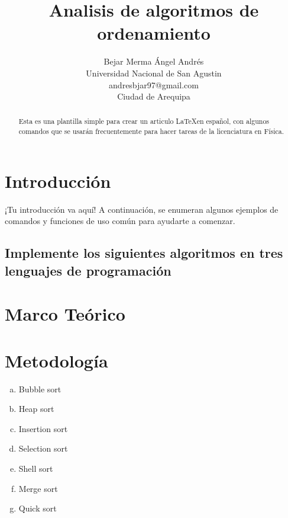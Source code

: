 \documentclass[a4paper]{article}
\title{Analisis de algoritmos de ordenamiento }
\author{Bejar Merma Ángel Andrés\\
  \small Universidad Nacional de San Agustin\\
  \small andresbjar97@gmail.com\\
  \small Ciudad de Arequipa
  \date{}
}
\begin{document}
\maketitle

\begin{abstract}
Esta es una plantilla simple para crear un articulo \LaTeX en español, con algunos comandos que se usarán frecuentemente para hacer tareas de la licenciatura en Física.
\end{abstract}

\section{Introducci\'on}

¡Tu introducción va aquí! A continuación, se enumeran algunos ejemplos de comandos y funciones de uso común para ayudarte a comenzar.








\subsection{Implemente los siguientes algoritmos en tres lenguajes de programación}





\section{Marco Teórico}

\section{Metodología}

\begin{enumerate}[a)]

\item Bubble sort

\item Heap sort

\item Insertion sort

\item Selection sort

\item Shell sort

\item  Merge sort

\item Quick sort
\end{enumerate}
\end{document}
